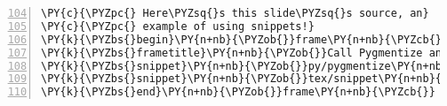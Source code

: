 \begin{Verbatim}[commandchars=\\\{\},numbers=left,numbersep=0.5em,firstnumber=104]
\PY{c}{\PYZpc{} Here\PYZsq{}s this slide\PYZsq{}s source, an}
\PY{c}{\PYZpc{} example of using snippets!}
\PY{k}{\PYZbs{}begin}\PY{n+nb}{\PYZob{}}frame\PY{n+nb}{\PYZcb{}}
\PY{k}{\PYZbs{}frametitle}\PY{n+nb}{\PYZob{}}Call Pygmentize and Use Snippets\PY{n+nb}{\PYZcb{}}
\PY{k}{\PYZbs{}snippet}\PY{n+nb}{\PYZob{}}py/pygmentize\PY{n+nb}{\PYZcb{}}
\PY{k}{\PYZbs{}snippet}\PY{n+nb}{\PYZob{}}tex/snippet\PY{n+nb}{\PYZus{}}example\PY{n+nb}{\PYZcb{}}
\PY{k}{\PYZbs{}end}\PY{n+nb}{\PYZob{}}frame\PY{n+nb}{\PYZcb{}}
\end{Verbatim}
